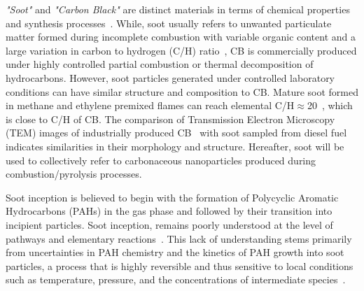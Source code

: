 \textit{"Soot"} and \textit{"Carbon Black"} are distinct materials in terms of chemical properties and synthesis processes~\cite{watson2001carbon}. While, soot usually refers to unwanted particulate matter formed during incomplete combustion with variable organic content and a large variation in carbon to hydrogen (C/H) ratio~\citep{watson2001carbon}, CB is commercially produced under highly controlled partial combustion or thermal decomposition of hydrocarbons. However, soot particles generated under controlled laboratory conditions can have similar structure and composition to CB. Mature soot formed in methane and ethylene premixed flames can reach elemental C/H$\approx$20~\cite{russo2015dehydrogenation}, which is close to C/H of CB. The comparison of Transmission Electron Microscopy (TEM) images of industrially produced CB~\citep{singh2018nanostructure} with soot sampled from diesel fuel~\citep{vander2007hrtem, lapuerta2017morphological} indicates similarities in their morphology and structure. Hereafter, soot will be used to collectively refer to carbonaceous nanoparticles produced during combustion/pyrolysis processes.

Soot inception is believed to begin with the formation of Polycyclic Aromatic Hydrocarbons (PAHs) in the gas phase and followed by their transition into incipient particles.
Soot inception, remains poorly understood at the level of pathways and elementary reactions~\citep{Wang2011}. This lack of understanding stems primarily from uncertainties in PAH chemistry and the kinetics of PAH growth into soot particles, a process that is highly reversible and thus sensitive to local conditions such as temperature, pressure, and the concentrations of intermediate species~\citep{Wang2011}.

